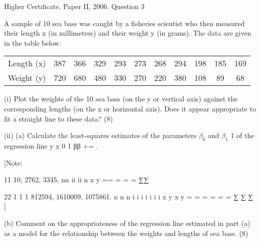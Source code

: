 \documentclass[a4paper,12pt]{article}
\begin{document}
Higher Certificate, Paper II, 2006.  Question 3 
 \begin{framed}
A sample of 10 sea bass was caught by a fisheries scientist who then measured their length x (in millimetres) and their weight y (in grams).  The data are given in the table below. 

\begin{center}
\begin{tabular}{cc|c|c|c|c|c|c|c|c|c} 
Length (x) &387 & 366& 329& 293& 273& 268& 294& 198 &185 & 169 \\ 
Weight (y) & 720& 680& 480& 330& 270& 220& 380& 108  & 89 &  68 \\
\end{tabular} 
\end{center}
(i) Plot the weights of the 10 sea bass (on the y or vertical axis) against the corresponding lengths (on the x or horizontal axis).  Does it appear appropriate to fit a straight line to these data? (8) 
 
(ii) (a) Calculate the least-squares estimates of the parameters $\beta_0$ and $\beta_1$ 1 of the regression line y x 0 1 ββ += . 
 
[Note: 
 
11 10, 2762, 3345, nn ii ii n x y == = = = ∑∑
 
 
22
1 1 1 812594, 1610009, 1075861. n n n i i i i i i i x y x y = = = = = = ∑ ∑ ∑ ] 
 
 
(b) Comment on the appropriateness of the regression line estimated in part (a) as a model for the relationship between the weights and lengths of sea bass. (8) 
 

 \end{framed}
\end{document}
